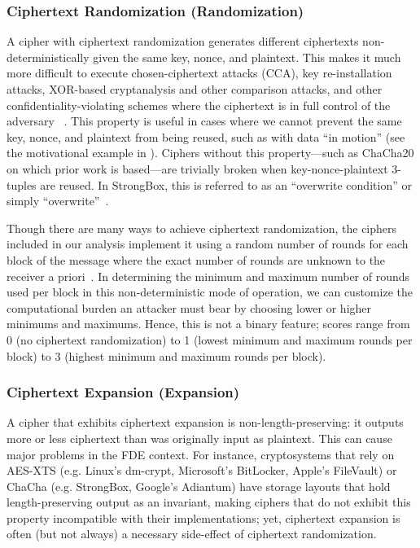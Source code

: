 \subsubsection{Ciphertext Randomization (Randomization)}

A cipher with ciphertext randomization generates different ciphertexts
non-deterministically given the same key, nonce, and plaintext. This makes it
much more difficult to execute chosen-ciphertext attacks (CCA), key
re-installation attacks, XOR-based cryptanalysis and other comparison attacks,
and other confidentiality-violating schemes where the ciphertext is in full
control of the adversary ~\cite{Freestyle}. This property is useful in cases
where we cannot prevent the same key, nonce, and plaintext from being
reused, such as with data ``in motion'' (see the motivational example in
). Ciphers without this property---such as ChaCha20 on which
prior work is based---are trivially broken when key-nonce-plaintext 3-tuples are
reused. In StrongBox, this is referred to as an ``overwrite condition'' or
simply ``overwrite''~\cite{StrongBox}.

Though there are many ways to achieve ciphertext randomization, the ciphers
included in our analysis implement it using a random number of rounds for each
block of the message where the exact number of rounds are unknown to the
receiver a priori~\cite{Freestyle}. In determining the minimum and maximum
number of rounds used per block in this non-deterministic mode of operation, we
can customize the computational burden an attacker must bear by choosing lower
or higher minimums and maximums. Hence, this is not a binary feature; scores
range from 0 (no ciphertext randomization) to 1 (lowest minimum and maximum
rounds per block) to 3 (highest minimum and maximum rounds per block).

\subsubsection{Ciphertext Expansion (Expansion)}

A cipher that exhibits ciphertext expansion is non-length-preserving: it outputs
more or less ciphertext than was originally input as plaintext. This can cause
major problems in the FDE context. For instance, cryptosystems that rely on
AES-XTS (e.g. Linux's dm-crypt, Microsoft's BitLocker, Apple's FileVault) or
ChaCha (e.g. StrongBox, Google's Adiantum) have storage layouts that hold
length-preserving output as an invariant, making ciphers that do not exhibit
this property incompatible with their implementations; yet, ciphertext expansion
is often (but not always) a necessary side-effect of ciphertext randomization.

